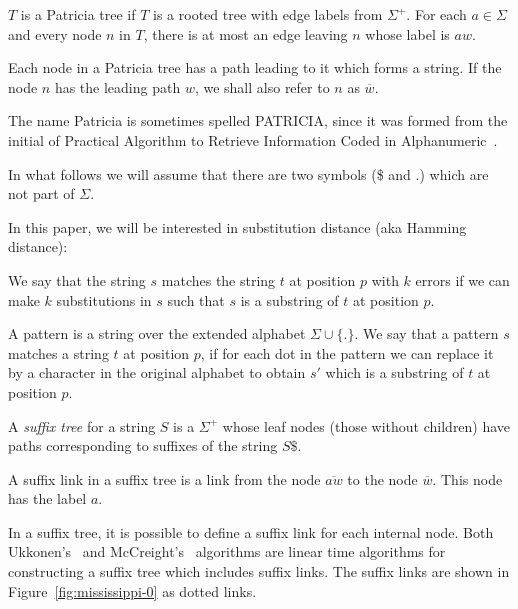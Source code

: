\begin{definition}
$T$ is a Patricia tree if $T$ is a rooted tree with edge labels from $\Sigma^+$. For each $a \in \Sigma$ and every node $n$ in $T$, there is at most an edge leaving $n$ whose label is $aw$.

Each node in a Patricia tree has a path leading to it which forms a string. If the node $n$ has the leading path $w$, we shall also refer to $n$ as $\overline{w}$.
\end{definition}

The name Patricia is sometimes spelled PATRICIA, since it was formed from the initial of Practical Algorithm to Retrieve Information Coded in Alphanumeric~\cite{DBLP:journals/jacm/Morrison68}.

In what follows we will assume that there are two symbols (\$ and $.$) which are not part of $\Sigma$.

In this paper, we will be interested in substitution distance (aka Hamming distance):

\begin{definition}
We say that the string $s$ matches the string $t$ at position $p$ with $k$ errors if we can make $k$ substitutions in $s$ such that $s$ is a substring of $t$ at position $p$.
\end{definition}


\begin{definition}[Pattern]
A pattern is a string over the extended alphabet $\Sigma\cup\{.\}$. We say that a pattern $s$ matches a string $t$ at position $p$, if for each dot in the pattern we can replace it by a character in the original alphabet to obtain $s'$ which is a substring of $t$ at position $p$.
\end{definition}

\begin{definition}
A \emph{suffix tree} for a string $S$ is a $\Sigma^+$ whose leaf nodes (those without children) have paths corresponding to suffixes of the string $S\$ $.
\end{definition}

\begin{definition}
A suffix link in a suffix tree is a link from the node $\overline{aw}$ to the node $\overline{w}$. This node has the label $a$.
\end{definition}

In a suffix tree, it is possible to define a suffix link for each internal node. Both Ukkonen's~\cite{ukkonen92constructing} and McCreight's~\cite{mccreight} algorithms are linear time algorithms for constructing a suffix tree which includes suffix links. The suffix links are shown in Figure~\ref{fig:mississippi-0} as dotted links.

